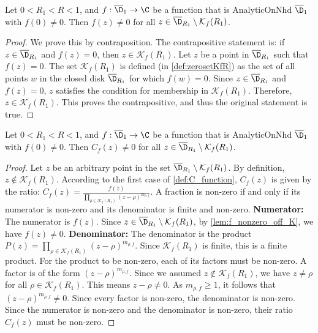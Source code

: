 \begin{lemma}\label{lem:f_nonzero_off_K} \leanok {}
Let $0<R_1<R<1$, and $f:\overline{\D}_1\to\C$ be a function that is AnalyticOnNhd $\overline{\D}_1$ with $f(0)\neq0$. Then $f(z)\neq0$ for all $z \in \overline{\D}_{R_1} \setminus \mathcal{K}_f(R_1)$.
\end{lemma}
\begin{proof}
\leanok
We prove this by contraposition. The contrapositive statement is: if $z \in \overline{\D}_{R_1}$ and $f(z)=0$, then $z \in \mathcal{K}_f(R_1)$.
Let $z$ be a point in $\overline{\D}_{R_1}$ such that $f(z)=0$.
The set $\mathcal{K}_f(R_1)$ is defined (in \cref{def:zerosetKfR}) as the set of all points $w$ in the closed disk $\overline{\D}_{R_1}$ for which $f(w)=0$.
Since $z \in \overline{\D}_{R_1}$ and $f(z)=0$, $z$ satisfies the condition for membership in $\mathcal{K}_f(R_1)$.
Therefore, $z \in \mathcal{K}_f(R_1)$.
This proves the contrapositive, and thus the original statement is true.
\end{proof}

\begin{lemma}\label{lem:C_nonzero_off_K} \leanok {}
Let $0<R_1<R<1$, and $f:\overline{\D}_1\to\C$ be a function that is AnalyticOnNhd $\overline{\D}_1$ with $f(0)\neq0$. Then $C_f(z)\neq0$ for all $z \in \overline{\D}_{R_1} \setminus \mathcal{K}_f(R_1)$.
\end{lemma}
\begin{proof}
\leanok
Let $z$ be an arbitrary point in the set $\overline{\D}_{R_1} \setminus \mathcal{K}_f(R_1)$.
By definition, $z \notin \mathcal{K}_f(R_1)$. According to the first case of \cref{def:C_function}, $C_f(z)$ is given by the ratio:
$C_f(z) = \frac{f(z)}{\prod_{\rho\in\mathcal{K}_f(R_1)}(z-\rho)^{m_{\rho,f}}}$.
A fraction is non-zero if and only if its numerator is non-zero and its denominator is finite and non-zero.
\textbf{Numerator:} The numerator is $f(z)$. Since $z \in \overline{\D}_{R_1} \setminus \mathcal{K}_f(R_1)$, by \cref{lem:f_nonzero_off_K}, we have $f(z) \neq 0$.
\textbf{Denominator:} The denominator is the product $P(z) = \prod_{\rho\in\mathcal{K}_f(R_1)}(z-\rho)^{m_{\rho,f}}$. Since $\mathcal{K}_f(R_1)$ is finite, this is a finite product. For the product to be non-zero, each of its factors must be non-zero. A factor is of the form $(z-\rho)^{m_{\rho,f}}$. Since we assumed $z \notin \mathcal{K}_f(R_1)$, we have $z \neq \rho$ for all $\rho \in \mathcal{K}_f(R_1)$. This means $z-\rho \neq 0$. As $m_{\rho,f} \ge 1$, it follows that $(z-\rho)^{m_{\rho,f}} \neq 0$. Since every factor is non-zero, the denominator is non-zero.
Since the numerator is non-zero and the denominator is non-zero, their ratio $C_f(z)$ must be non-zero.
\end{proof}

